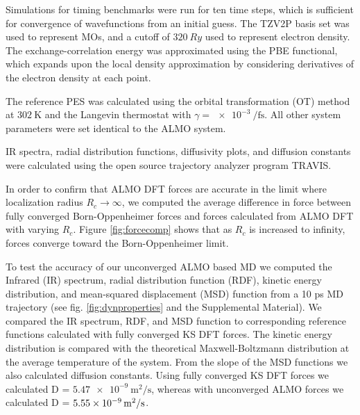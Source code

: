 \documentclass[aps,prl,reprint,amsmath,amssymb]{revtex4-1}
\begin{document}
Simulations for timing benchmarks were run for ten time steps, which is sufficient for convergence of wavefunctions from an initial guess.
The TZV2P basis set was used to represent MOs, and a cutoff of $\SI{320}{Ry}$ used to represent electron density. 
The exchange-correlation energy was approximated using the PBE functional, which expands upon the local density approximation by considering derivatives of the electron density at each point.~\cite{a:PBEfunctional} 

The reference PES was calculated using the orbital transformation (OT) method~\cite{a:ot,a:ot2} at $\SI{302}{\K}$ and the Langevin thermostat with $\gamma = \SI{e-3}{\per\fs}$. 
All other system parameters were set identical to the ALMO system.

IR spectra, radial distribution functions, diffusivity plots, and diffusion constants were calculated using the open source trajectory analyzer program TRAVIS.~\cite{a:travis-main,a:travis-ir1,a:travis-ir2}


In order to confirm that ALMO DFT forces are accurate in the limit where localization radius $R_{c} \rightarrow \infty$, we computed the average difference in force between fully converged Born-Oppenheimer forces and forces calculated from ALMO DFT with varying $R_{c}$. 
Figure \ref{fig:forcecomp} shows that as $R_{c}$ is increased to infinity, forces converge toward the Born-Oppenheimer limit.

To test the accuracy of our unconverged ALMO based MD we computed the Infrared (IR) spectrum, radial distribution function (RDF), kinetic energy distribution, and mean-squared displacement (MSD) function from a 10 ps MD trajectory (see fig. \ref{fig:dynproperties} and the Supplemental Material). 
We compared the IR spectrum, RDF, and MSD function to corresponding reference functions calculated with fully converged KS DFT forces.
The kinetic energy distribution is compared with the theoretical Maxwell-Boltzmann distribution at the average temperature of the system.
From the slope of the MSD functions we also calculated diffusion constants.
Using fully converged KS DFT forces we calculated D = $\SI{5.47e-9}{\m^{2}\per\s}$, whereas with unconverged ALMO forces we calculated D = $\SI{5.55E-09}{\m^{2}\per\s}$.
\end{document}
